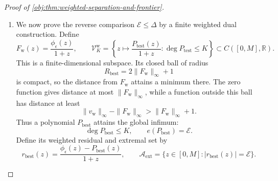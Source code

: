 \begin{proof}[Proof of \cref{obj:thm:weighted-separation-and-frontier}]
\begin{enumerate}
\item
We now prove the reverse comparison \(\mathcal E\le\Delta\) by a finite weighted dual construction. Define
\[
F_{\mathrm w}(z)=\frac{\phi_\epsilon(z)}{1+z},
\qquad
\mathcal V_K^{\mathrm w}
=\left\{
z\mapsto\frac{P_{\mathrm{test}}(z)}{1+z}:
\deg P_{\mathrm{test}}\le K
\right\}
\subset C([0,M],\mathbb R).
\]
This is a finite-dimensional subspace. Its closed ball of radius
\[
R_{\mathrm{best}}=2\|F_{\mathrm w}\|_\infty+1
\]
is compact, so the distance from \(F_{\mathrm w}\) attains a minimum there. The zero function gives distance at most \(\|F_{\mathrm w}\|_\infty\), while a function outside this ball has distance at least
\[
\|v_{\mathrm w}\|_\infty-\|F_{\mathrm w}\|_\infty
>\|F_{\mathrm w}\|_\infty+1.
\]
Thus a polynomial \(P_{\mathrm{best}}\) attains the global infimum:
\[
\deg P_{\mathrm{best}}\le K,
\qquad
e(P_{\mathrm{best}})=\mathcal E.
\]
Define its weighted residual and extremal set by
\[
r_{\mathrm{best}}(z)
=\frac{\phi_\epsilon(z)-P_{\mathrm{best}}(z)}{1+z},
\qquad
\mathcal A_{\mathrm{ext}}
=\{z\in[0,M]:|r_{\mathrm{best}}(z)|=\mathcal E\}.
\]


\end{enumerate}
\end{proof}
